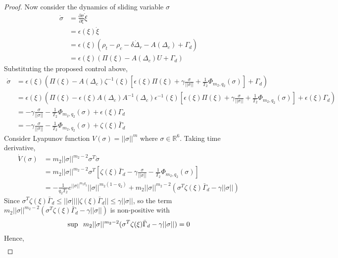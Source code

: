 \documentclass[]{article}
\theoremstyle{remark}
\theoremstyle{definition}
\begin{document}
\begin{proof}
	Now consider the dynamics of sliding variable $ \sigma $ 
	\begin{align}
		\dot \sigma  &= \frac{\partial \sigma}{\partial \xi}\dot \xi \\
		& = \epsilon(\xi)\dot \xi \\
		& = \epsilon(\xi)(\rho_t-\rho_c-\delta\dot\Delta_r-A(\Delta_c)+\Gamma_d)\\
		&= \epsilon(\xi)(\Pi(\xi)-A(\Delta_c)U+ \Gamma_d) 
	\end{align}
Substituting the proposed control above,
\begin{align}
	\dot \sigma &= \epsilon(\xi)(\Pi(\xi)-A(\Delta_c)\zeta^{-1}(\xi)\left[\epsilon(\xi)\Pi(\xi)+ \gamma \frac{\sigma}{||\sigma||} + \frac{1}{T_2}\Phi_{m_2,q_2}(\sigma)\right]+ \Gamma_d) \\
	& = \epsilon(\xi)(\Pi(\xi) - \epsilon(\xi)A(\Delta_c)A^{-1}(\Delta_c)\epsilon^{-1}(\xi)\left[\epsilon(\xi)\Pi(\xi)+ \gamma \frac{\sigma}{||\sigma||} + \frac{1}{T_2}\Phi_{m_2,q_2}(\sigma)\right]+ \epsilon(\xi)\Gamma_d) \\
	& = -\gamma \frac{\sigma}{||\sigma||} - \frac{1}{T_2}\Phi_{m_2,q_2}(\sigma)+ \epsilon(\xi)\Gamma_d \\
	& = -\gamma \frac{\sigma}{||\sigma||} - \frac{1}{T_2}\Phi_{m_2,q_2}(\sigma)+ \zeta(\xi)\bar\Gamma_d
\end{align}
Consider Lyapunov function $ V(\sigma) = ||\sigma||^m $ where $ \sigma\in \mathbb{R}^6$.
Taking time derivative,
\begin{align}
	\dot V(\sigma) &= m_2||\sigma||^{m_2-2}\sigma^T\dot \sigma \\
	& = m_2||\sigma||^{m_2-2}\sigma^T\left[\zeta(\xi)\bar\Gamma_d-\gamma \frac{\sigma}{||\sigma||} - \frac{1}{T_2}\Phi_{m_2,q_2}(\sigma)\right]\\
	& = -\frac{1}{q_2T_2}e^{||\sigma||^{m_2q_2}}||\sigma||^{m_2(1-q_2)} + m_2||\sigma||^{m_2-2}(\sigma^T\zeta(\xi)\bar\Gamma_d -\gamma||\sigma||)
	\end {align}
	Since $\sigma^T\zeta(\xi)\bar\Gamma_d\leq ||\sigma||||\zeta(\xi)\bar\Gamma_d||\leq \gamma||\sigma||$, so the term $m_2||\sigma||^{m_2-2}(\sigma^T\zeta(\xi)\bar\Gamma_d -\gamma||\sigma||)$ is non-positive with 
	\begin{align}
		\sup \hspace{2mm}m_2||\sigma||^{m_2-2}(\sigma^T\zeta(\xi)\bar\Gamma_d -\gamma||\sigma||) = 0 
	\end{align}
	Hence,
	\begin{align}

\end{align}
\end{proof}
\end{document}
